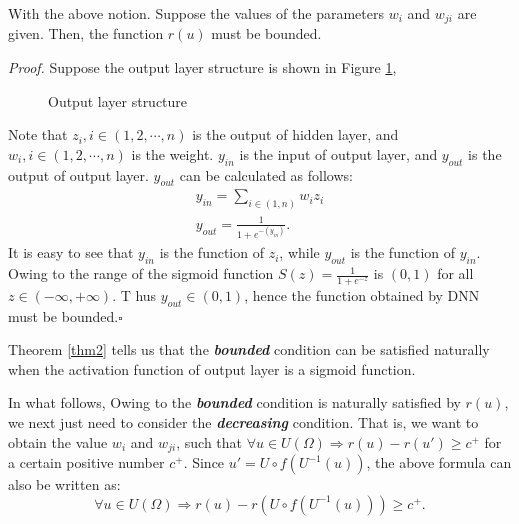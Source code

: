 \begin{mythm}\label{thm2}
	With the above notion. Suppose the values of the parameters $w_i$ and $w_{ji}$ are given. Then, the function $r(u)$ must be bounded.
\end{mythm}
\emph{Proof.}
Suppose the output layer structure is shown in Figure \ref{outputlayer},
\begin{figure}[H] 
	\caption{Output layer structure}
	\label{outputlayer}      %
\end{figure}

Note that ${z_i},i \in (1,2, \cdots ,n)$ is the output of hidden layer, and ${w_i},i \in (1,2, \cdots ,n)$ is the weight. ${y_{in}}$ is the input of output layer, and ${y_{out}}$ is the output of output layer. ${y_{out}}$ can be calculated as follows:
\begin{equation}\label{equ:y}
\begin{array}{l}
{y_{in}} = \sum\limits_{i \in (1,n)} {{w_i}{z_i}} \\
{y_{out}} = \frac{1}{{1 + {e^{ - ({y_{in}})}}}}.
\end{array}
\end{equation}
It is easy to see that ${y_{in}}$ is the function of ${z_i}$, while ${y_{out}}$ is the function of ${y_{in}}$.
Owing to the range of the sigmoid function $S(z)=\frac{1}{{1 + {e^{ - z}}}}$ is $(0,1)$ for all $z \in (-\infty, +\infty)$. T hus ${y_{out}} \in (0,1)$, hence the function obtained by DNN must be bounded.$\square$

\begin{rem}
	Theorem \ref{thm2} tells us that the \textbf{\emph{bounded}} condition can be satisfied naturally when the activation function of output layer is a sigmoid function.
\end{rem}

In what follows, Owing to the \textbf{\emph{bounded}} condition is naturally satisfied by $r(u)$, we next just need to consider the \textbf{\emph{decreasing}} condition. That is, we want to obtain the value $w_i$ and $w_{ji}$, such that $\forall u \in U(\Omega ) \Rightarrow r(u) - r(u') \ge {c^ + }$ for a certain positive number $c^+$. Since $u' = U \circ f({U^{ - 1}}(u))$, the above formula can also be written as:
\begin{equation}\label{equ:decreasing condition}
\forall u \in U(\Omega ) \Rightarrow r(u) - r(U \circ f({U^{ - 1}}(u))) \ge {c^ + }.
\end{equation}


